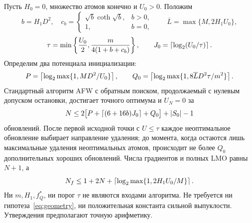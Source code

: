 \begin{theorem}
\label{thm:zerofinite}
Пусть $H_0=0$, множество атомов конечно и $U_0>0$. Положим
\[
 b=H_1D^2,\quad
 c_b=\begin{cases}\sqrt b\coth\sqrt b,&b>0,\\1,&b=0,\end{cases}
 \qquad \overline L=\max\{M,2H_1U_0\},
\]
\begin{equation}\label{eq:zerothreshold}
 \tau=\min\left\{\frac{U_0}2,
       \frac{m}{4(1+b+c_b)}\right\},\qquad
 J_0=\left\lceil\log_2(U_0/\tau)\right\rceil.
\end{equation}
Определим два потенциала инициализации:
\[
 P=\left\lceil\log_2\max\{1,MD^2/U_0\}\right\rceil,\qquad
 Q_0=\left\lceil\log_2\max\{1,8\overline L D^2\tau/m^2\}\right\rceil.
\]
Стандартный алгоритм AFW с обратным поиском, продолжаемый с нулевым
допуском остановки, достигает точного оптимума и $U_N=0$ за
\begin{equation}\label{eq:zerofinite}
 N\le2\big[P+\left\lceil(6+16b)J_0\right\rceil+Q_0\big]+|S_0|-1
\end{equation}
обновлений. После первой исходной точки с $U\le\tau$ каждое
неоптимальное обновление выбирает направление удаления; до момента,
когда остаются лишь максимальные удаления неоптимальных атомов,
происходит не более $Q_0$ дополнительных хороших обновлений.
Числа градиентов и полных LMO равны $N+1$, а
\[
 N_f\le1+2N+\left\lceil\log_2\max\{1,2H_1U_0/M\}\right\rceil.
\]
Ни $m,H_1,f_Q^*$, ни порог $\tau$ не являются входами алгоритма.
Не требуется ни гипотеза~\eqref{eq:geometry}, ни положительная
константа сильной выпуклости. Утверждения предполагают точную арифметику.
\end{theorem}
